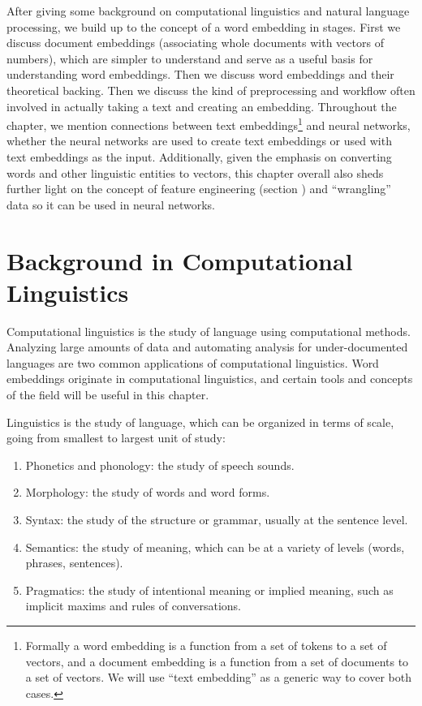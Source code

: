 After giving some background on computational linguistics and natural language processing, we build up to the concept of a word embedding in stages. First we discuss document embeddings (associating whole documents with vectors of numbers), which are simpler to understand and serve as a useful basis for understanding word embeddings. Then we discuss word embeddings and their theoretical backing.  Then we discuss the kind of preprocessing and workflow often involved in actually taking a text and creating an embedding. Throughout the chapter, we mention connections between text embeddings\footnote{Formally a word embedding is a function from a set of tokens to a set of vectors, and a document embedding is a function from a set of documents to a set of vectors.  We will use ``text embedding'' as a generic way to cover both cases.} and neural networks, whether the neural networks are used to create text embeddings or used with text embeddings as the input.
Additionally, given the emphasis on converting words and other linguistic entities to vectors, this chapter overall also sheds further light on the concept of feature engineering (section ) and ``wrangling'' data so it can be used in neural networks.

\section{Background in Computational Linguistics}

Computational linguistics is the study of language using computational methods. Analyzing large amounts of data and automating analysis for under-documented languages are two common applications of computational linguistics. Word embeddings originate in computational linguistics, and certain tools and concepts of the field will be useful in this chapter.

Linguistics is the study of language, which can be organized in terms of scale, going from smallest to largest unit of study:
\begin{enumerate}
\item Phonetics and phonology: the study of speech sounds.
\item Morphology: the study of words and word forms.
\item Syntax: the study of the structure or grammar, usually at the sentence level.
\item Semantics: the study of meaning, which can be at a variety of levels (words, phrases, sentences).
\item Pragmatics: the study of intentional meaning or implied meaning, such as implicit maxims and rules of conversations.
\end{enumerate}

